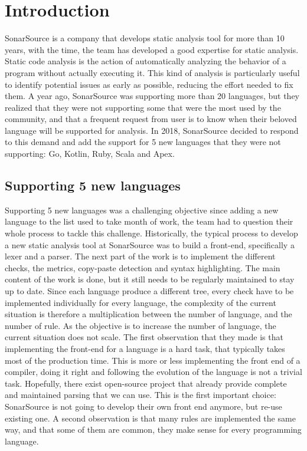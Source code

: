 \section{Introduction}
\label{sec:introduction}
SonarSource is a company that develops static analysis tool for more than 10 years, with the time, the team has developed a good expertise for static analysis.
Static code analysis is the action of automatically analyzing the behavior of a program without actually executing it.
This kind of analysis is particularly useful to identify potential issues as early as possible, reducing the effort needed to fix them.
A year ago, SonarSource was supporting more than 20 languages, but they realized that they were not supporting some that were the most used by the community, and that a frequent request from user is to know when their beloved language will be supported for analysis. 
In 2018, SonarSource decided to respond to this demand and add the support for 5 new languages that they were not supporting: Go, Kotlin, Ruby, Scala and Apex.

\subsection{Supporting 5 new languages}
\label{subsec:5_new_languages}
Supporting 5 new languages was a challenging objective since adding a new language to the list used to take month of work, the team had to question their whole process to tackle this challenge.
Historically, the typical process to develop a new static analysis tool at SonarSource was to build a front-end, specifically a lexer and a parser.
The next part of the work is to implement the different checks, the metrics, copy-paste detection and syntax highlighting. The main content of the work is done, but it still needs to be regularly maintained to stay up to date.
Since each language produce a different tree, every check have to be implemented individually for every language, the complexity of the current situation is therefore a multiplication between the number of language, and the number of rule. 
As the objective is to increase the number of language, the current situation does not scale.
The first observation that they made is that implementing the front-end for a language is a hard task, that typically takes most of the production time. This is more or less implementing the front end of a compiler, doing it right and following the evolution of the language is not a trivial task.
Hopefully, there exist open-source project that already provide complete and maintained parsing that we can use. 
This is the first important choice: SonarSource is not going to develop their own front end anymore, but re-use existing one.
A second observation is that many rules are implemented the same way, and that some of them are common, they make sense for every programming language.


